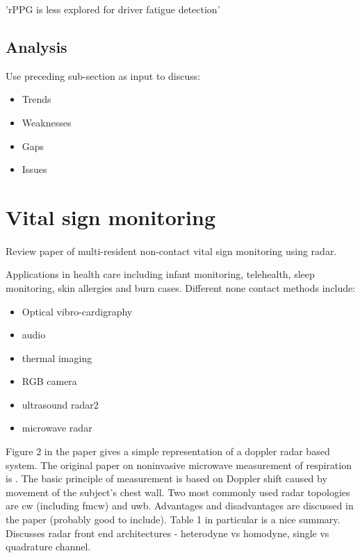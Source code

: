 \documentclass[11pt, parskip=half*,twoside=false]{scrbook}
\begin{document}
'rPPG is less explored for driver fatigue detection'


\subsection{Analysis}
Use preceding sub-section as input to discuss:
\begin{itemize}
	\item Trends
	\item Weaknesses
	\item Gaps
	\item Issues
\end{itemize}


\section{Vital sign monitoring}

\paragraph{\citep{singhMultiResidentNonContactVital2021}} Review paper of multi-resident non-contact vital sign monitoring using radar.

Applications in health care including infant monitoring, telehealth, sleep monitoring, skin allergies and burn cases.  Different none contact methods include:
\begin{itemize}
	\item Optical vibro-cardigraphy
	\item audio
	\item thermal imaging
	\item RGB camera
	\item ultrasound radar2
	\item microwave radar
\end{itemize}

Figure 2 in the paper gives a simple representation of a doppler radar based system. The original paper on noninvasive microwave measurement of respiration is  \citep{linNoninvasiveMicrowaveMeasurement1975}. The basic principle of measurement is based on Doppler shift caused by movement of the subject's chest wall.  Two most commonly used radar topologies are \gls{cw} (including \gls{fmcw}) and \gls{uwb}. Advantages and disadvantages are discussed in the paper (probably good to include). Table 1 in particular is a nice summary. Discusses radar front end architectures - heterodyne vs homodyne, single vs quadrature channel.
\end{document}
